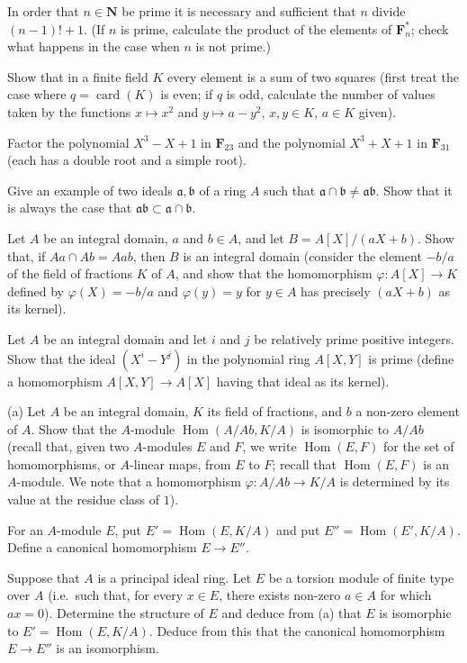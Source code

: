  In order that $n\in\mathbf{N}$ be prime it is necessary and
sufficient that $n$ divide $(n-1)!+1$. (If $n$ is prime, calculate the
product of the elements of $\mathbf{F}_{n}^{*}$; check what happens in the
case when $n$ is not prime.)

 Show that in a finite field $K$ every element is a sum of two
squares (first treat the case where $q=\operatorname{card}(K)$ is even; if
$q$ is odd, calculate the number of values taken by the functions
$x\mapsto x^{2}$ and $y\mapsto a-y^{2}$, $x,y\in K$, $a\in K$ given).

 Factor the polynomial $X^{3}-X+1$ in $\mathbf{F}_{23}$ and the
polynomial $X^{3}+X+1$ in $\mathbf{F}_{31}$ (each has a double root and a
simple root).

 Give an example of two ideals $\mathfrak{a},\mathfrak{b}$ of a
ring $A$ such that
$\mathfrak{a}\cap\mathfrak{b}\neq\mathfrak{a}\mathfrak{b}$. Show that it is
always the case that
$\mathfrak{a}\mathfrak{b}\subset\mathfrak{a}\cap\mathfrak{b}$.

 Let $A$ be an integral domain, $a$ and $b\in A$, and let
$B=A[X]/(aX+b)$. Show that, if
$Aa\cap Ab=Aab$, then $B$ is an integral domain (consider the element
$-b/a$ of the field of fractions $K$ of $A$, and show that the homomorphism
$\varphi:A[X]\to K$ defined by $\varphi(X)=-b/a$ and $\varphi(y)=y$ for
$y\in A$ has precisely $(aX+b)$ as its kernel).

 Let $A$ be an integral domain and let $i$ and $j$ be relatively
prime positive integers. Show that the ideal $(X^{i}-Y^{j})$ in the
polynomial ring $A[X,Y]$ is prime (define a homomorphism
$A[X,Y]\to A[X]$ having that ideal as its kernel).

 (a) Let $A$ be an integral domain, $K$ its field of fractions,
and $b$ a non-zero element of $A$. Show that the $A$-module
$\operatorname{Hom}(A/Ab,K/A)$ is isomorphic to $A/Ab$ (recall that, given
two $A$-modules $E$ and $F$, we write $\operatorname{Hom}(E,F)$ for the set
of homomorphisms, or $A$-linear maps, from $E$ to $F$; recall that
$\operatorname{Hom}(E,F)$ is an $A$-module. We note that a homomorphism
$\varphi:A/Ab\to K/A$ is determined by its value at the residue class of
$1$).
\begin{alist}
\item For an $A$-module $E$, put $E'=\operatorname{Hom}(E,K/A)$ and put
$E''=\operatorname{Hom}(E',K/A)$. Define a canonical homomorphism
$E\to E''$.
\item Suppose that $A$ is a principal ideal ring. Let $E$ be a torsion
module of finite type over $A$ (i.e.\ such that, for every $x\in E$, there
exists non-zero $a\in A$ for which $ax=0$). Determine the structure of $E$
and deduce from (a) that $E$ is isomorphic to
$E'=\operatorname{Hom}(E,K/A)$. Deduce from this that the canonical
homomorphism $E\to E''$ is an isomorphism.
\end{alist}

